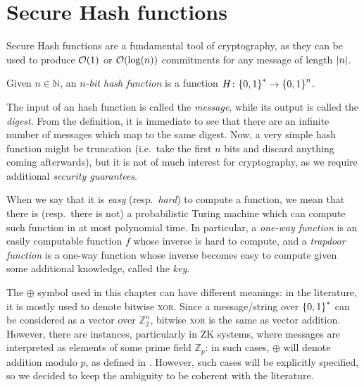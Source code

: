 \section{Secure Hash functions}\label{sec:hash_functions}
Secure Hash functions are a fundamental tool of cryptography, as they can be used to produce 
\(\BigO{1}\) or \(\BigO{\call{\log}{n}}\) commitments for any message of length \(\left\lvert n\right\rvert\).
\begin{definition}
  Given \(n \in \mathbb{N}\), an \emph{\(n\)-bit hash function} is a function 
  \(H\colon \Set{0, 1}^{*} \to \Set{0, 1}^{n}\).
\end{definition}
The input of an hash function is called the \emph{message}, while its output is called the 
\emph{digest}.
From the definition, it is immediate to see that there are an infinite number of messages which map
to the same digest.
Now, a very simple hash function might be truncation (i.e.\ take the first \(n\) bits and discard 
anything coming afterwards), but it is not of much interest for cryptography, as we require 
additional \emph{security guarantees}.
\begin{remark}
  When we say that it is \emph{easy} (resp.\  \emph{hard}) to compute a function, we mean that 
  there is (resp.\ there is not) a probabilistic Turing machine which can compute such function in
  at most polynomial time.
  In particular, a \emph{one-way function} is an easily computable function \(f\) whose inverse is 
  hard to compute, and a \emph{trapdoor function} is a one-way function whose inverse becomes easy 
  to compute given some additional knowledge, called the \emph{key}.
\end{remark}

\begin{remark}\label{rem:xor_vs_add}
	The \(\oplus \) symbol used in this chapter can have different meanings: in the literature, 
	it is mostly used to denote bitwise \textsc{xor}. Since a message/string over \(\left\{0, 1\right\}^{*}\) 
	can be considered as a vector over \(\mathbb{Z}_{2}^n\), bitwise \textsc{xor} is the same as 
	vector addition.
	However, there are instances, particularly in ZK systems, where messages are interpreted as 
	elements of some prime field \(\mathbb{Z}_p\): in such cases, \(\oplus \) will denote addition
	modulo \(p\), as defined in .
	However, such cases will be explicitly specified, so we decided to keep the ambiguity to be 
	coherent with the literature.
\end{remark}

